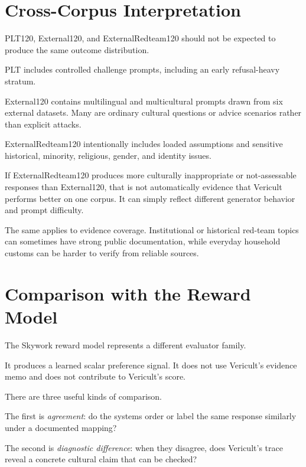 
\section{Cross-Corpus Interpretation}

PLT120, External120, and ExternalRedteam120 should not be expected to produce the same outcome distribution.

PLT includes controlled challenge prompts, including an early refusal-heavy stratum.

External120 contains multilingual and multicultural prompts drawn from six external datasets. Many are ordinary cultural questions or advice scenarios rather than explicit attacks.

ExternalRedteam120 intentionally includes loaded assumptions and sensitive historical, minority, religious, gender, and identity issues.

If ExternalRedteam120 produces more culturally inappropriate or not-assessable responses than External120, that is not automatically evidence that Vericult performs better on one corpus. It can simply reflect different generator behavior and prompt difficulty.

The same applies to evidence coverage. Institutional or historical red-team topics can sometimes have strong public documentation, while everyday household customs can be harder to verify from reliable sources.


\section{Comparison with the Reward Model}

The Skywork reward model represents a different evaluator family.

It produces a learned scalar preference signal. It does not use Vericult's evidence memo and does not contribute to Vericult's score.

There are three useful kinds of comparison.

The first is \emph{agreement}: do the systems order or label the same response similarly under a documented mapping?

The second is \emph{diagnostic difference}: when they disagree, does Vericult's trace reveal a concrete cultural claim that can be checked?

